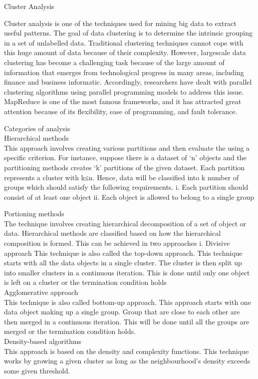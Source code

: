 \documentclass[conference]{IEEEtran}
\begin{document}
Cluster Analysis

Cluster analysis is one of the techniques used for mining big data to extract useful patterns. The goal of data clustering is to determine the intrinsic grouping in a set of unlabelled data. Traditional clustering techniques cannot cope with this huge amount of data because of their complexity. However, largescale data clustering has become a challenging task because of the large amount of information that emerges from technological progress in many areas, including finance and business informatic. Accordingly, researchers have dealt with parallel clustering algorithms using parallel programming models to address this issue. MapReduce is one of the most famous frameworks, and it has attracted great attention because of its flexibility, ease of programming, and fault tolerance.


Categories of analysis\\

Hierarchical methods\\

This approach involves creating various partitions and then evaluate the using a specific criterion. For instance, suppose there is a dataset of ‘n’ objects and the partitioning methods creates ‘k’ partitions of the given dataset. Each partition represents a cluster with k≤n. Hence, data will be classified into k number of groups which should satisfy the following requirements.
i. Each partition should consist of at least one object
ii. Each object is allowed to belong to a single group

Portioning methods \\

The technique involves creating hierarchical decomposition of a set of object or data. Hierarchical methods are classified based on how the hierarchical composition is formed. This can be achieved in two approaches
i. Divisive approach
This technique is also called the top-down approach. This technique starts with all the data objects in a single cluster. The cluster is then split up into smaller clusters in a continuous iteration. This is done until only one object is left on a cluster or the termination condition holds\\

Agglomerative approach\\

This technique is also called bottom-up approach. This approach starts with one data object making up a single group. Group that are close to each other are then merged in a continuous iteration. This will be done until all the groups are merged or the termination condition holds.\\
Density-based algorithms\\
This approach is based on the density and complexity functions. This technique works by growing a given cluster as long as the neighbourhood’s density exceeds some given threshold.\\
\end{document}
